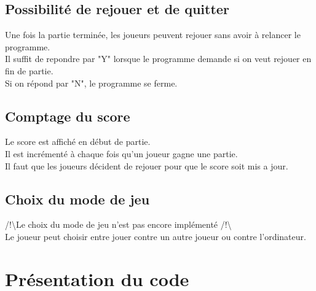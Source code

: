 \documentclass{article}
\begin{document}
\subsection{Possibilité de rejouer et de quitter}
Une fois la partie terminée, les joueurs peuvent rejouer sans avoir à relancer le programme.\\
Il suffit de repondre par "Y" lorsque le programme demande si on veut rejouer en fin de partie.\\
Si on répond par "N", le programme se ferme.\\

\subsection{Comptage du score}
Le score est affiché en début de partie.\\
Il est incrémenté à chaque fois qu'un joueur gagne une partie.\\
Il faut que les joueurs décident de rejouer pour que le score soit mis a jour.\\

\subsection{Choix du mode de jeu}
/!\textbackslash Le choix du mode de jeu n'est pas encore implémenté /!\textbackslash \\
Le joueur peut choisir entre jouer contre un autre joueur ou contre l'ordinateur. 
\newpage
\section{Présentation du code}
\end{document}
